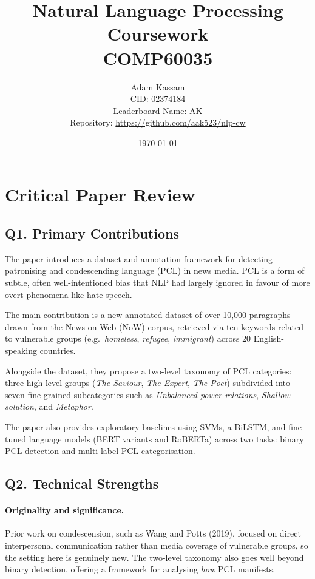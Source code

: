 \documentclass[11pt,a4paper]{article}
\title{%
    \textbf{Natural Language Processing Coursework} \\[0.3em]
    \large COMP60035
}
\author{
    Adam Kassam \\
    CID: 02374184 \\ [1em]
    Leaderboard Name: AK \\[0.5em]
    Repository: \url{https://github.com/aak523/nlp-cw}
}
\date{\today}
\begin{document}
\maketitle

\section{Critical Paper Review}
\label{sec:ex1}

\subsection*{Q1. Primary Contributions}

The paper introduces a dataset and annotation framework for detecting patronising and condescending language (PCL) in news media. PCL is a form of subtle, often well-intentioned bias that NLP had largely ignored in favour of more overt phenomena like hate speech.

The main contribution is a new annotated dataset of over 10,000 paragraphs drawn from the News on Web (NoW) corpus, retrieved via ten keywords related to vulnerable groups (e.g.\ \textit{homeless}, \textit{refugee}, \textit{immigrant}) across 20 English-speaking countries.

Alongside the dataset, they propose a two-level taxonomy of PCL categories: three high-level groups (\textit{The Saviour}, \textit{The Expert}, \textit{The Poet}) subdivided into seven fine-grained subcategories such as \textit{Unbalanced power relations}, \textit{Shallow solution}, and \textit{Metaphor}.

The paper also provides exploratory baselines using SVMs, a BiLSTM, and fine-tuned language models (BERT variants and RoBERTa) across two tasks: binary PCL detection and multi-label PCL categorisation.

\subsection*{Q2. Technical Strengths}

\paragraph{Originality and significance.} Prior work on condescension, such as Wang and Potts (2019), focused on direct interpersonal communication rather than media coverage of vulnerable groups, so the setting here is genuinely new. The two-level taxonomy also goes well beyond binary detection, offering a framework for analysing \textit{how} PCL manifests.
\end{document}

